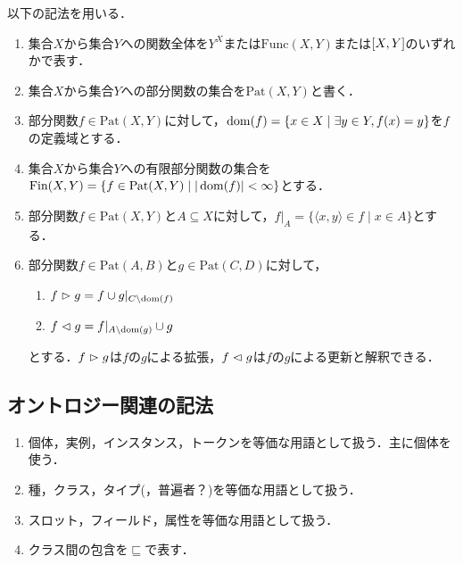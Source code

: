 \documentclass[../main-detail.tex]{subfiles}
\begin{document}
\begin{definition}[関数の記法]
    以下の記法を用いる．
    \begin{enumerate}[label=(\arabic*)]
    \item 集合$X$から集合$Y$への関数全体を$Y^X$または$\text{Func}(X,Y)$または$[X,Y]$のいずれかで表す．
    \item 集合$X$から集合$Y$への部分関数の集合を$\text{Pat}(X,Y)$と書く．
    \item 部分関数$f\in\text{Pat}(X,Y)$に対して，$\mathop{\mathrm{dom}}\nolimits(f) = \{x\in X \mid \exists y\in Y, f(x)=y\}$を$f$の定義域とする．
    \item 集合$X$から集合$Y$への有限部分関数の集合を$\text{Fin}(X,Y) = \{f\in\text{Pat}(X,Y) \mid |\mathop{\mathrm{dom}}\nolimits(f)| < \infty\}$とする．
    \item 部分関数$f\in\text{Pat}(X,Y)$と$A \subseteq X$に対して，$f|_A = \{\langle x,y\rangle \in f \mid x\in A\}$とする．
    \item 部分関数$f\in\text{Pat}(A,B)$と$g\in\text{Pat}(C, D)$に対して，
    \begin{enumerate}
        \item $f \vartriangleright g = f \cup g|_{C \setminus \mathop{\mathrm{dom}}\nolimits(f)}$
        \item $f \vartriangleleft g = f|_{A \setminus \mathop{\mathrm{dom}}\nolimits(g)} \cup g$
    \end{enumerate}
    とする．$f \vartriangleright g$は$f$の$g$による拡張，$f \vartriangleleft g$は$f$の$g$による更新と解釈できる．
\end{enumerate}
\end{definition}
\subsection{オントロジー関連の記法}
\begin{enumerate}
    \item 個体，実例，インスタンス，トークンを等価な用語として扱う．主に個体を使う．
    \item 種，クラス，タイプ(，普遍者？)を等価な用語として扱う．
    \item スロット，フィールド，属性を等価な用語として扱う．
    \item クラス間の包含を$\sqsubseteq$で表す．
\end{enumerate}
\end{document}
